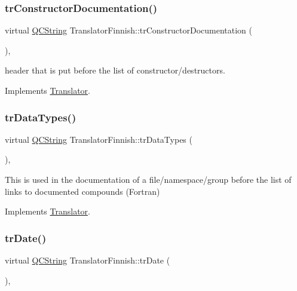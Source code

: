 \subsubsection{\texorpdfstring{trConstructorDocumentation()}{trConstructorDocumentation()}}
{\footnotesize\ttfamily virtual \mbox{\hyperlink{class_q_c_string}{Q\+C\+String}} Translator\+Finnish\+::tr\+Constructor\+Documentation (\begin{DoxyParamCaption}{ }\end{DoxyParamCaption})\hspace{0.3cm}{\ttfamily [inline]}, {\ttfamily [virtual]}}

header that is put before the list of constructor/destructors. 

Implements \mbox{\hyperlink{class_translator}{Translator}}.

\mbox{\label{class_translator_finnish_abec148e263f5fd26e53d69e2beeac2c5}} 
\subsubsection{\texorpdfstring{trDataTypes()}{trDataTypes()}}
{\footnotesize\ttfamily virtual \mbox{\hyperlink{class_q_c_string}{Q\+C\+String}} Translator\+Finnish\+::tr\+Data\+Types (\begin{DoxyParamCaption}{ }\end{DoxyParamCaption})\hspace{0.3cm}{\ttfamily [inline]}, {\ttfamily [virtual]}}

This is used in the documentation of a file/namespace/group before the list of links to documented compounds (Fortran) 

Implements \mbox{\hyperlink{class_translator}{Translator}}.

\mbox{\label{class_translator_finnish_ad009d40b33e14917ba8e915c2cbfb0d0}} 
\subsubsection{\texorpdfstring{trDate()}{trDate()}}
{\footnotesize\ttfamily virtual \mbox{\hyperlink{class_q_c_string}{Q\+C\+String}} Translator\+Finnish\+::tr\+Date (\begin{DoxyParamCaption}{ }\end{DoxyParamCaption})\hspace{0.3cm}{\ttfamily [inline]}, {\ttfamily [virtual]}}

